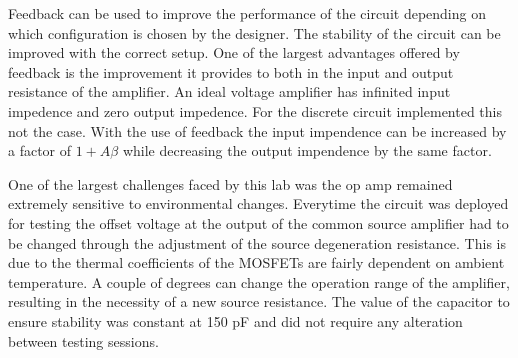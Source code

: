 Feedback can be used to improve the performance of the circuit depending on which configuration is chosen by the designer. The stability of the circuit can be improved with the correct setup. One of the largest advantages offered by feedback is the improvement it provides to both in the input and output resistance of the amplifier. An ideal voltage amplifier has infinited input impedence and zero output impedence. For the discrete circuit implemented this not the case. With the use of feedback the input impendence can be increased by a factor of $1+A\beta$ while decreasing the output impendence by the same factor.

One of the largest challenges faced by this lab was the op amp remained extremely sensitive to environmental changes. Everytime the circuit was deployed for testing the offset voltage at the output of the common source amplifier had to be changed through the adjustment of the source degeneration resistance. This is due to the thermal coefficients of the MOSFETs are fairly dependent on ambient temperature. A couple of degrees can change the operation range of the amplifier, resulting in the necessity of a new source resistance. The value of the capacitor to ensure stability was constant at 150 pF and did not require any alteration between testing sessions.




